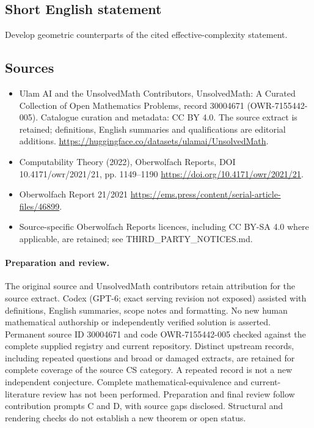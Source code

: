 \documentclass[11pt]{article}
\begin{document}
\subsection{Short English statement}
Develop geometric counterparts of the cited effective-complexity statement.
\subsection{Sources}
\begin{itemize}
\item[\hypertarget{source:30004671:1}{S1}] Ulam AI and the UnsolvedMath Contributors, UnsolvedMath: A Curated Collection of Open Mathematics Problems, record 30004671 (OWR-7155442-005). Catalogue curation and metadata: CC BY 4.0. The source extract is retained; definitions, English summaries and qualifications are editorial additions.
\url{https://huggingface.co/datasets/ulamai/UnsolvedMath}.
\item[\hypertarget{source:30004671:2}{S2}] Computability Theory (2022), Oberwolfach Reports, DOI 10.4171/owr/2021/21, pp. 1149--1190
\url{https://doi.org/10.4171/owr/2021/21}.
\item[\hypertarget{source:30004671:3}{S3}] Oberwolfach Report 21/2021
\url{https://ems.press/content/serial-article-files/46899}.
\item Source-specific Oberwolfach Reports licences, including CC BY-SA 4.0 where applicable, are retained; see THIRD\_PARTY\_NOTICES.md.
\end{itemize}
\paragraph{Preparation and review.}
The original source and UnsolvedMath contributors retain attribution for the source extract. Codex (GPT-6; exact serving revision not exposed) assisted with definitions, English summaries, scope notes and formatting. No new human mathematical authorship or independently verified solution is asserted. Permanent source ID 30004671 and code OWR-7155442-005 checked against the complete supplied registry and current repository. Distinct upstream records, including repeated questions and broad or damaged extracts, are retained for complete coverage of the source CS category. A repeated record is not a new independent conjecture. Complete mathematical-equivalence and current-literature review has not been performed. Preparation and final review follow contribution prompts C and D, with source gaps disclosed. Structural and rendering checks do not establish a new theorem or open status.
\label{end:30004671}
\end{document}
